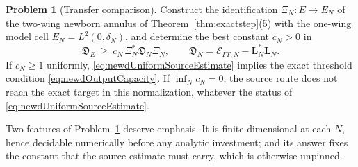 \documentclass[11pt]{amsart}
\theoremstyle{definition}
\newtheorem{problem}[theorem]{Problem}
\theoremstyle{remark}
\begin{document}
\begin{problem}[Transfer comparison]\label{prob:newdTransferComparison}
Construct the identification \(\Xi_N:E\to E_N\) of the two-wing newborn
annulus of Theorem~\ref{thm:exactstep}(5) with the one-wing model cell
\(E_N=L^2(0,\delta_N)\), and determine the best constant \(c_N>0\) in
\[
 \mathfrak D_E\ \ge\ c_N\,\Xi_N^*\mathfrak D_N\Xi_N,
 \qquad
 \mathfrak D_N=\mathcal E_{\Gamma T,N}-\mathbf L_N^*\mathbf L_N .
\]
If \(c_N\ge1\) uniformly, \eqref{eq:newdUniformSourceEstimate} implies the
exact threshold condition \eqref{eq:newdOutputCapacity}.  If
\(\inf_Nc_N=0\), the source route does not reach the exact target in this
normalization, whatever the status of
\eqref{eq:newdUniformSourceEstimate}.
\end{problem}

Two features of Problem~\ref{prob:newdTransferComparison} deserve emphasis.
It is finite-dimensional at each \(N\), hence decidable numerically before
any analytic investment; and its answer fixes the constant that the source
estimate must carry, which is otherwise unpinned.
\end{document}
